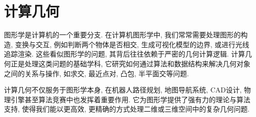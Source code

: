 \documentclass[a4paper]{ctexart}
\begin{document}
\section{计算几何}

图形学是计算机的一个重要分支. 在计算机图形学中, 我们常常需要处理图形的构造, 变换与交互, 例如判断两个物体是否相交, 生成可视化模型的边界, 或进行光线追踪渲染. 这些看似图形学的问题, 其背后往往依赖于严密的几何计算逻辑. 计算几何正是处理这类问题的基础学科, 它研究如何通过算法和数据结构来解决几何对象之间的关系与操作, 如求交, 最近点对, 凸包, 半平面交等问题.

计算几何不仅服务于图形学本身, 在机器人路径规划, 地图导航系统, CAD设计, 物理引擎甚至算法竞赛中也发挥着重要作用. 它为图形学提供了强有力的理论与算法支持, 使得我们能以更高效, 更精确的方式处理二维或三维空间中的复杂几何问题.


\end{document}
